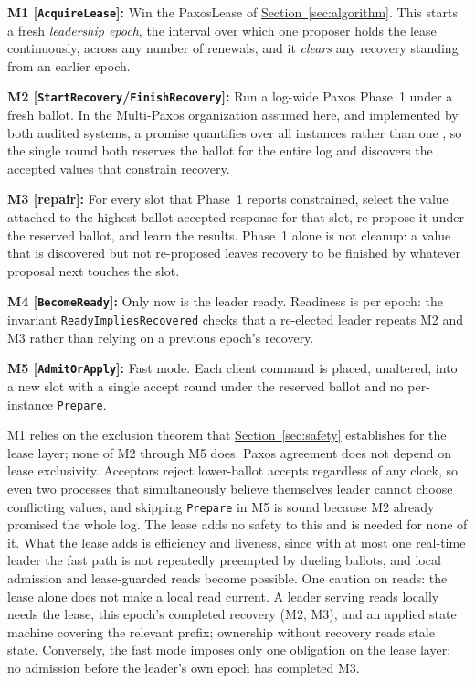 \documentclass[final,5p,times,twocolumn,number]{elsarticle}
\newcommand{\code}[1]{\texttt{#1}}
\newcommand{\invitem}[1]{\smallskip\noindent\textbf{#1:} }
\newcommand{\secref}[1]{\hyperref[#1]{Section~\ref*{#1}}}
\begin{document}
\invitem{M1 [\code{AcquireLease}]}Win the PaxosLease of \secref{sec:algorithm}.  This starts a fresh \emph{leadership epoch}, the interval over which one proposer holds the lease continuously, across any number of renewals, and it \emph{clears} any recovery standing from an earlier epoch.

\invitem{M2 [\code{StartRecovery}/\code{FinishRecovery}]}Run a log-wide Paxos Phase~1 under a fresh ballot.  In the Multi-Paxos organization assumed here, and implemented by both audited systems, a promise quantifies over all instances rather than one \cite{ref2,ref9}, so the single round both reserves the ballot for the entire log and discovers the accepted values that constrain recovery.

\invitem{M3 [repair]}For every slot that Phase~1 reports constrained, select the value attached to the highest-ballot accepted response for that slot, re-propose it under the reserved ballot, and learn the results.  Phase~1 alone is not cleanup: a value that is discovered but not re-proposed leaves recovery to be finished by whatever proposal next touches the slot.

\invitem{M4 [\code{BecomeReady}]}Only now is the leader ready.  Readiness is per epoch: the invariant \code{ReadyImpliesRecovered} checks that a re-elected leader repeats M2 and M3 rather than relying on a previous epoch's recovery.

\invitem{M5 [\code{AdmitOrApply}]}Fast mode.  Each client command is placed, unaltered, into a new slot with a single accept round under the reserved ballot and no per-instance \code{Prepare}.

M1 relies on the exclusion theorem that \secref{sec:safety} establishes for the lease layer; none of M2 through M5 does.  Paxos agreement does not depend on lease exclusivity.  Acceptors reject lower-ballot accepts regardless of any clock, so even two processes that simultaneously believe themselves leader cannot choose conflicting values, and skipping \code{Prepare} in M5 is sound because M2 already promised the whole log.  The lease adds no safety to this and is needed for none of it.  What the lease adds is efficiency and liveness, since with at most one real-time leader the fast path is not repeatedly preempted by dueling ballots, and local admission and lease-guarded reads become possible.  One caution on reads: the lease alone does not make a local read current.  A leader serving reads locally needs the lease, this epoch's completed recovery (M2, M3), and an applied state machine covering the relevant prefix; ownership without recovery reads stale state.  Conversely, the fast mode imposes only one obligation on the lease layer: no admission before the leader's own epoch has completed M3.
\end{document}
